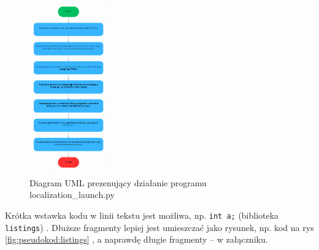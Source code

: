 \documentclass[a4paper,twoside,12pt]{book}
\begin{document}
\begin{figure}[!hb]
	\centering
	\includegraphics[width=0.3\textwidth]{images/uml-lidar.png}
	\caption{Diagram UML prezenujący działanie programu localization\_launch.py}
	\label{fig:diagram-loc}
\end{figure}


Krótka wstawka kodu w linii tekstu jest możliwa, np.  \lstinline|int a;| (biblioteka \texttt{listings})%
. 
Dłuższe fragmenty lepiej jest umieszczać jako rysunek, np. kod na rys \ref{fig:pseudokod:listings}%
, a naprawdę długie fragmenty – w załączniku.


%      

%      
\end{document}
